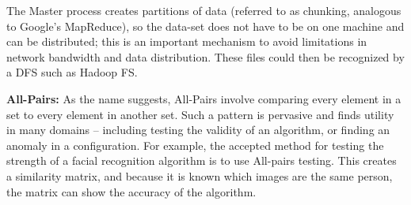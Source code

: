 \documentclass[conference,final]{IEEEtran}
\newcommand{\michaelnote}[1]{ {\textcolor{blue} { ***MM: #1 }}}
\newcommand{\michaelnote}[1]{ {\textcolor{blue} { ***MM: #1 }}}
\begin{document}
The Master process creates partitions of data (referred to as
chunking, analogous to Google's MapReduce), so the data-set does not
have to be on one machine and can be distributed; this is an important
mechanism to avoid limitations in network bandwidth and data
distribution.  These files could then be recognized by a DFS such as
Hadoop FS.





{\bf All-Pairs: } As the name suggests, All-Pairs involve comparing
every element in a set to every element in another set.  Such a
pattern is pervasive and finds utility in many domains -- including
testing the validity of an algorithm, or finding an anomaly in a
configuration.  For example, the accepted method for testing the
strength of a facial recognition algorithm is to use All-pairs
testing.  This creates a similarity matrix, and because it is known
which images are the same person, the matrix can show the accuracy of
the algorithm.
\end{document}
